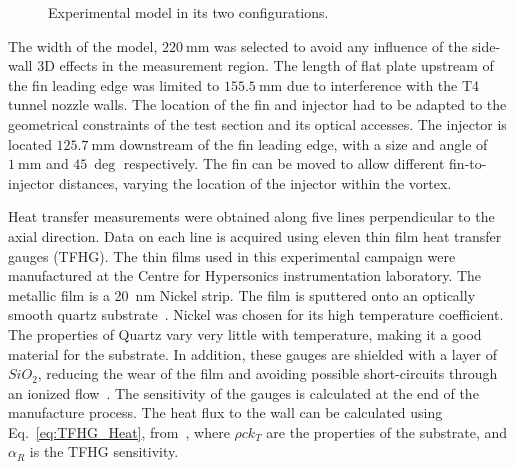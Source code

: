 \documentclass{AIAA}
\begin{document}
%
\begin{figure}[!h]
\center
{}
\caption{Experimental model in its two configurations.}
\label{fig:ModelPics}
\end{figure} 

 The width of the model, $\SI{220}{\milli\meter}$ was selected to avoid any influence of the side-wall 3D effects in the measurement region. The length of flat plate upstream of the fin leading edge was limited to $\SI{155.5}{\milli\meter}$ due to interference with the T4 tunnel nozzle walls. The location of the fin and injector had to be adapted to the geometrical constraints of the test section and its optical accesses. The injector is located $\SI{125.7}{\milli\meter}$ downstream of the fin leading edge, with a size and angle of $\SI{1}{\milli\meter}$ and $\SI{45}{\deg}$ respectively. The fin can be moved to allow different fin-to-injector distances, varying the location of the injector within the vortex. 
 
Heat transfer measurements were obtained along five lines perpendicular to the axial direction. Data on each line is acquired using eleven thin film heat transfer gauges (TFHG). The thin films used in this experimental campaign were manufactured at the Centre for Hypersonics instrumentation laboratory. The metallic film is a \SI{20}{\nano\meter} Nickel strip. The film is sputtered onto an optically smooth quartz substrate~\cite{Wise_Thesis}. Nickel was chosen for its high temperature coefficient. The properties of Quartz vary very little with temperature, making it a good material for the substrate. In addition, these gauges are shielded with a layer of $SiO_2$, reducing the wear of the film and avoiding possible short-circuits through an ionized flow~\cite{Wise_Thesis}. The sensitivity of the gauges is calculated at the end of the manufacture process. The heat flux to the wall can be calculated using Eq.~\ref{eq:TFHG_Heat}, from~\cite{Wise_Thesis,Schultz_Book}, where $\rho c k_T$ are the properties of the substrate, and $\alpha_R$ is the TFHG sensitivity.
\end{document}
